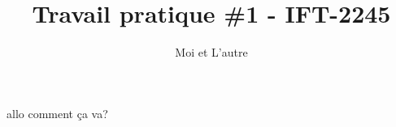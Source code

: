 \documentclass{article}
\title{Travail pratique \#1 - IFT-2245}
\author{Moi et L'autre}
\begin{document}
\maketitle

allo comment ça va?
\end{document}
